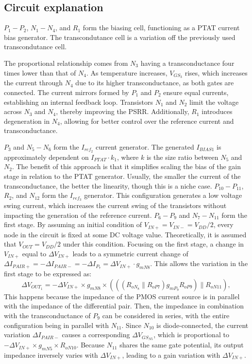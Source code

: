 \documentclass[12pt]{article}
\begin{document}
\subsection{Circuit explanation}
$P_1 - P_2$, $N_1 - N_4$, and $R_1$ form the biasing cell, functioning as a PTAT current bias generator.  The transcondutance cell is a variation off the previously used transcondutance cell.

The proportional relationship comes from $N_3$ having a transconductance four times lower than that of $N_4$. As temperature increases, $V_{GS_3}$ rises, which increases the current through $N_4$ due to its higher transconductance, as both gates are connected. The current mirrors formed by $P_1$ and $P_2$ ensure equal currents, establishing an internal feedback loop. Transistors $N_1$ and $N_2$ limit the voltage across $N_3$ and $N_4$, thereby improving the PSRR. Additionally, $R_1$ introduces degeneration in $N_4$, allowing for better control over the reference current and transconductance.

$P_3$ and $N_5-N_6$ form the $I_{ref_2}$ current generator. The generated $I_{BIAS1}$ is approximately dependent on $I_{PTAT} \cdot k_1$, where $k$ is the size ratio between $N_5$ and $N_2$. The benefit of this approach is that it simplifies scaling the bias of the gain stage in relation to the PTAT generator. Usually, the smaller the current of the transconductance, the better the linearity, though this is a niche case. $P_{10}-P_{11}$, $R_2$, and $N_{12}$ form the $I_{ref_3}$ generator. This configuration generates a low voltage swing current, which increases the current swing of the transistors without impacting the generation of the reference current. $P_6-P_9$ and $N_7-N_{11}$ form the first stage.  By assuming an initial condition of $V_{IN+} = V_{IN-} = V_{DD}/2$, every node in the circuit is fixed at some DC voltage value. Theoretically, it is assumed that $V_{OUT} = V_{DD}/2$ under this condition. Focusing on the first stage, a change in $V_{IN+}$ equal to $\Delta V_{IN+}$ leads to a symmetric current change of $\Delta I_{PAIR+} = -\Delta I_{PAIR-} = -\Delta I_{P_7} = \Delta V_{IN+} \cdot g_{mN8}$. This allows the variation in the first stage to be expressed as: \[ \Delta V_{OUT_1} = -\Delta V_{IN+} \times g_{mN8} \times \left( ((R_{oN_{8}} \parallel R_{oP7}) g_{mP_9} R_{oP9}) \parallel R_{oN11} \right), \] This happens because the impedance of the PMOS current source is in parallel with the impedance of the differential pair. Then, the impedance in combination with the transconductance of $P_9$ can be considered in series, with the entire configuration being in parallel with $N_{11}$.  Since $N_{10}$ is diode-connected, the current variation $\Delta I_{PAIR-}$ causes a corresponding $\Delta V_{GS_{N5}}$, which is proportional to $-\Delta V_{IN+} \times g_{mN5} \times R_{oN10}$. Because $N_{11}$ shares the same gate potential, its output impedance inversely varies with $\Delta V_{IN+}$, leading to a gain variation with $\Delta V_{IN+}$. 
\end{document}
